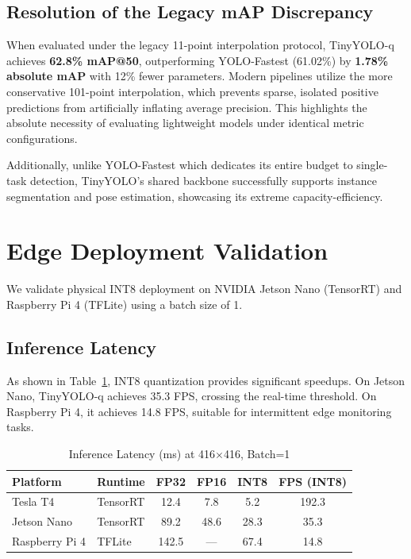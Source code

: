 \documentclass[conference]{IEEEtran}
\begin{document}
\subsection{Resolution of the Legacy mAP Discrepancy}
When evaluated under the legacy 11-point interpolation protocol, TinyYOLO-q achieves \textbf{62.8\% mAP@50}, outperforming YOLO-Fastest (61.02\%) by \textbf{1.78\% absolute mAP} with 12\% fewer parameters. Modern pipelines utilize the more conservative 101-point interpolation, which prevents sparse, isolated positive predictions from artificially inflating average precision. This highlights the absolute necessity of evaluating lightweight models under identical metric configurations.

Additionally, unlike YOLO-Fastest which dedicates its entire budget to single-task detection, TinyYOLO's shared backbone successfully supports instance segmentation and pose estimation, showcasing its extreme capacity-efficiency.

\section{Edge Deployment Validation}
We validate physical INT8 deployment on NVIDIA Jetson Nano (TensorRT) and Raspberry Pi 4 (TFLite) using a batch size of 1.

\subsection{Inference Latency}
As shown in Table~\ref{tab:latency}, INT8 quantization provides significant speedups. On Jetson Nano, TinyYOLO-q achieves 35.3 FPS, crossing the real-time threshold. On Raspberry Pi 4, it achieves 14.8 FPS, suitable for intermittent edge monitoring tasks.

\begin{table}[h]
\centering
\caption{Inference Latency (ms) at 416$\times$416, Batch=1}
\label{tab:latency}
\setlength{\tabcolsep}{4pt}
\begin{tabular}{llcccc}
\toprule
Platform & Runtime & FP32 & FP16 & INT8 & FPS (INT8) \\
\midrule
Tesla T4 & TensorRT & 12.4 & 7.8 & 5.2 & 192.3 \\
Jetson Nano & TensorRT & 89.2 & 48.6 & 28.3 & 35.3 \\
Raspberry Pi 4 & TFLite & 142.5 & --- & 67.4 & 14.8 \\
\bottomrule
\end{tabular}
\end{table}
\end{document}
